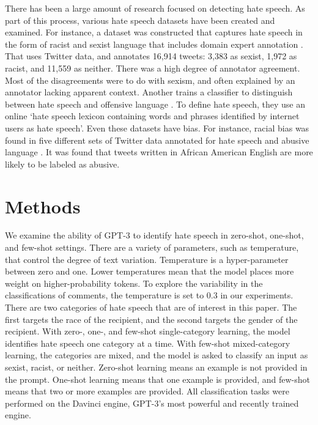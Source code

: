 \documentclass{bmcart}
\begin{document}
There has been a large amount of research focused on detecting hate speech. As part of this process, various hate speech datasets have been created and examined. For instance, a dataset was constructed that captures hate speech in the form of racist and sexist language that includes domain expert annotation \cite{waseem2016hateful}. That uses Twitter data, and annotates 16,914 tweets: 3,383 as sexist, 1,972 as racist, and 11,559 as neither. There was a high degree of annotator agreement. Most of the disagreements were to do with sexism, and often explained by an annotator lacking apparent context. Another trains a classifier to distinguish between hate speech and offensive language \cite{davidson2017automated}. To define hate speech, they use an online `hate speech lexicon containing words and phrases identified by internet users as hate speech'. Even these datasets have bias. For instance, racial bias was found in five different sets of Twitter data annotated for hate speech and abusive language \cite{davidson2019racial}. It was found that tweets written in African American English are more likely to be labeled as abusive.


\section{Methods}\label{methods}

We examine the ability of GPT-3 to identify hate speech in zero-shot, one-shot, and few-shot settings. There are a variety of parameters, such as temperature, that control the degree of text variation. Temperature is a hyper-parameter between zero and one. Lower temperatures mean that the model places more weight on higher-probability tokens. To explore the variability in the classifications of comments, the temperature is set to 0.3 in our experiments. There are two categories of hate speech that are of interest in this paper. The first targets the race of the recipient, and the second targets the gender of the recipient. With zero-, one-, and few-shot single-category learning, the model identifies hate speech one category at a time. With few-shot mixed-category learning, the categories are mixed, and the model is asked to classify an input as sexist, racist, or neither. Zero-shot learning means an example is not provided in the prompt. One-shot learning means that one example is provided, and few-shot means that two or more examples are provided. All classification tasks were performed on the Davinci engine, GPT-3's most powerful and recently trained engine.
\end{document}
